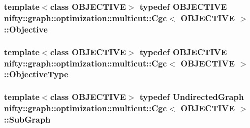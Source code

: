 \subsubsection[{Objective}]{\setlength{\rightskip}{0pt plus 5cm}template$<$class O\+B\+J\+E\+C\+T\+I\+V\+E$>$ typedef O\+B\+J\+E\+C\+T\+I\+V\+E {\bf nifty\+::graph\+::optimization\+::multicut\+::\+Cgc}$<$ O\+B\+J\+E\+C\+T\+I\+V\+E $>$\+::{\bf Objective}}\label{classnifty_1_1graph_1_1optimization_1_1multicut_1_1Cgc_ac3e728f92d355814ff3b40b5f7d59123}
\hypertarget{classnifty_1_1graph_1_1optimization_1_1multicut_1_1Cgc_a10339a861b453cdeb2e85e8371bd013d}{}
\subsubsection[{Objective\+Type}]{\setlength{\rightskip}{0pt plus 5cm}template$<$class O\+B\+J\+E\+C\+T\+I\+V\+E$>$ typedef O\+B\+J\+E\+C\+T\+I\+V\+E {\bf nifty\+::graph\+::optimization\+::multicut\+::\+Cgc}$<$ O\+B\+J\+E\+C\+T\+I\+V\+E $>$\+::{\bf Objective\+Type}}\label{classnifty_1_1graph_1_1optimization_1_1multicut_1_1Cgc_a10339a861b453cdeb2e85e8371bd013d}
\hypertarget{classnifty_1_1graph_1_1optimization_1_1multicut_1_1Cgc_a477a719159f23300cd8e627a825e9275}{}
\subsubsection[{Sub\+Graph}]{\setlength{\rightskip}{0pt plus 5cm}template$<$class O\+B\+J\+E\+C\+T\+I\+V\+E$>$ typedef {\bf Undirected\+Graph} {\bf nifty\+::graph\+::optimization\+::multicut\+::\+Cgc}$<$ O\+B\+J\+E\+C\+T\+I\+V\+E $>$\+::{\bf Sub\+Graph}}\label{classnifty_1_1graph_1_1optimization_1_1multicut_1_1Cgc_a477a719159f23300cd8e627a825e9275}
\hypertarget{classnifty_1_1graph_1_1optimization_1_1multicut_1_1Cgc_afb4bc97ca8d80719f67fe59823ac9466}{}
